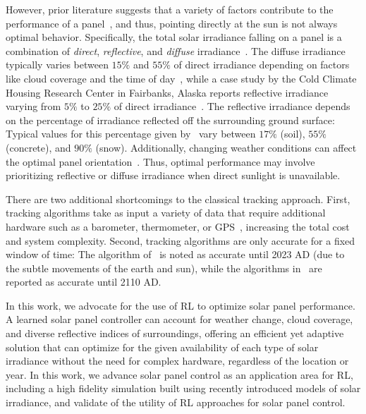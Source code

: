 \documentclass{article}
\begin{document}
However, prior literature suggests that a variety of factors contribute to the performance of a panel~\cite{King2001}, and thus, pointing directly at the sun is not always optimal behavior. Specifically, the total solar irradiance falling on a panel is a combination of {\it direct}, {\it reflective}, and {\it diffuse} irradiance~\cite{Benghanem2011}. The diffuse irradiance typically varies between $15\%$ and $55\%$ of direct irradiance depending on factors like cloud coverage and the time of day~\cite{peterson1981ratio}, while a case study by the Cold Climate Housing Research Center in Fairbanks, Alaska reports reflective irradiance varying from $5\%$ to $25\%$ of direct irradiance~\cite{colgan2010}. The reflective irradiance depends on the percentage of irradiance reflected off the surrounding ground surface: Typical values for this percentage given by~\citet{mcevoy2003practical} vary between $17\%$ (soil), $55\%$ (concrete), and $90\%$ (snow). Additionally, changing weather conditions can affect the optimal panel orientation~\cite{Kelly2009}. Thus, optimal performance may involve prioritizing reflective or diffuse irradiance when direct sunlight is unavailable.

There are two additional shortcomings to the classical tracking approach. First, tracking algorithms take as input a variety of data that require additional hardware such as a barometer, thermometer, or GPS~\cite{Grena2012}, increasing the total cost and system complexity. Second, tracking algorithms are only accurate for a fixed window of time: The algorithm of~\citet{Grena2008} is noted as accurate until 2023 AD (due to the subtle movements of the earth and sun), while the algorithms in~\citet{Grena2012} are reported as accurate until 2110 AD.

In this work, we advocate for the use of RL to optimize solar panel performance. A learned solar panel controller can account for weather change, cloud coverage, and diverse reflective indices of surroundings, offering an efficient yet adaptive solution that can optimize for the given availability of each type of solar irradiance without the need for complex hardware, regardless of the location or year. In this work, we advance solar panel control as an application area for RL, including a high fidelity simulation built using recently introduced models of solar irradiance, and validate of the utility of RL approaches for solar panel control.

\end{document}
